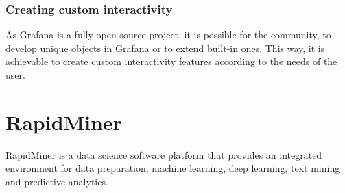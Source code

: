 \subsubsection{Creating custom interactivity}

As Grafana is a fully open source project, it is possible for the community, to develop unique objects in Grafana or to extend built-in ones. This way, it is achievable to create custom interactivity features according to the needs of the user.



\section{RapidMiner}


RapidMiner is a data science software platform that provides an integrated environment for data preparation, machine learning, deep learning, text mining and predictive analytics. \cite{rapidminer-about} \cite{rapidminer-wikipedia}


